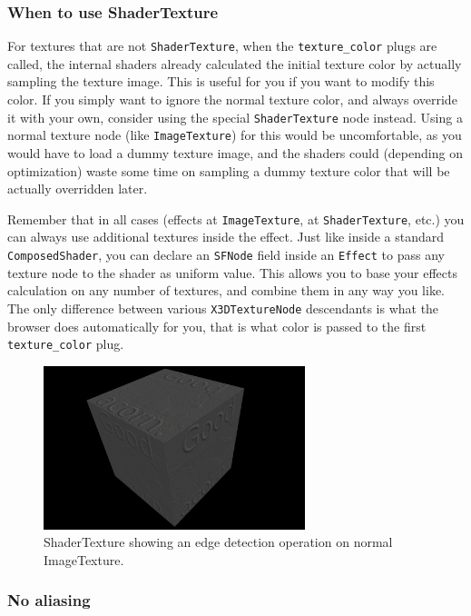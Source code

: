 \documentclass{acmsiggraph}                     %
\begin{document}
\subsubsection{When to use ShaderTexture}

For textures that are not \texttt{ShaderTexture},
when the \texttt{texture\_color} plugs are called,
the internal shaders already calculated the initial texture
color by actually sampling the texture image. This is useful for you if you
want to modify this color. If you simply want to ignore the normal
texture color, and always override it with your own, consider using
the special \texttt{ShaderTexture} node instead. Using
a normal texture node (like \texttt{ImageTexture}) for this
would be uncomfortable, as you would have to load a dummy texture image,
and the shaders could (depending on optimization) waste some time
on sampling a dummy texture color that will be actually overridden later.

Remember that in all cases (effects at \texttt{ImageTexture},
at \texttt{ShaderTexture}, etc.) you can always use additional
textures inside the effect. Just like inside a standard \texttt{ComposedShader},
you can declare an \texttt{SFNode} field inside an \texttt{Effect}
to pass any texture node to the shader as uniform value.
This allows you to base your effects calculation on any number of textures,
and combine them in any way you like. The only difference
between various \texttt{X3DTextureNode} descendants is what the browser
does automatically for you, that is what color is passed
to the first \texttt{texture\_color} plug.

\begin{figure}[H]
  \centering
  \includegraphics[width=3in]{shader_texture_edge_detection}
  \caption{ShaderTexture showing an edge detection operation on normal ImageTexture.}
\end{figure}

\subsubsection{No aliasing}
\end{document}
